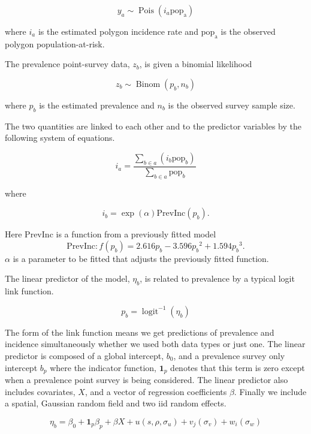 \documentclass[10pt,letterpaper]{article}
\begin{document}
$$y_a \sim \operatorname{Pois}(i_a\mathrm{pop_a})$$

where $i_a$ is the estimated polygon incidence rate and $\mathrm{pop_a}$ is the observed polygon population-at-risk.

The prevalence point-survey data, $z_b$, is given a binomial likelihood

$$z_b \sim \operatorname{Binom}(p_b, n_b) $$

where $p_b$ is the estimated prevalence and $n_b$ is the observed survey sample size. 

The two quantities are linked to each other and to the predictor variables by the following system of equations.

$$i_a = \frac{ \sum_{b \in a}(i_b \mathrm{pop}_b)}{\sum_{b \in a}\mathrm{pop}_b} $$

where

$$i_b = \exp(\alpha)\mathrm{PrevInc}(p_b).$$

Here $\mathrm{PrevInc}$ is a function from a previously fitted model \cite{cameron2015defining} 
$$\mathrm{PrevInc}: f\left(p_b\right) = 2.616p_b - 3.596{p_b}^2 + 1.594{p_b}^3.$$
$\alpha$ is a parameter to be fitted that adjusts the previously fitted function.

The linear predictor of the model, $\eta_b$, is related to prevalence by a typical logit link function.

$$p_b = \operatorname{logit}^{-1}(\eta_b)$$


The form of the link function means we get predictions of prevalence and incidence simultaneously whether we used both data types or just one.
The linear predictor is composed of a global intercept, $b_0$, and a prevalence survey only intercept $b_p$ where the indicator function, $\mathbf{1}_p$ denotes that this term is zero except when a prevalence point survey is being considered.
The linear predictor also includes covariates, $X$, and a vector of regression coefficients $\beta$.
Finally we include a spatial, Gaussian random field and two iid random effects.

$$\eta_b = \beta_0 + \mathbf{1}_p\beta_p +  \beta X  + u(s, \rho, \sigma_u) + v_j(\sigma_v) + w_i(\sigma_w)$$
\end{document}
